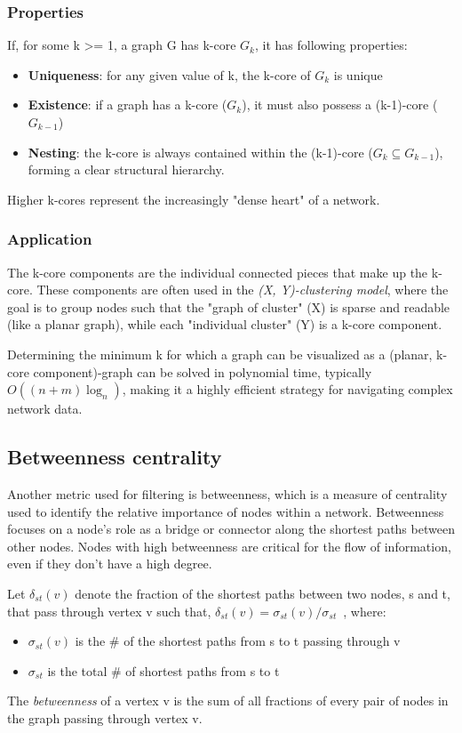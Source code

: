 \subsubsection{Properties}
If, for some k >= 1, a graph G has k-core \(G_k\), it has following properties:
\begin{itemize}[noitemsep]
    \item \textbf{Uniqueness}: for any given value of k, the k-core of \(G_k\) is unique
    \item \textbf{Existence}: if a graph has a k-core (\(G_k\)), it must also possess a (k-1)-core (\(G_{k-1}\))
    \item \textbf{Nesting}: the k-core is always contained within the (k-1)-core (\(G_k \subseteq G_{k-1}\)), forming a clear structural hierarchy.
\end{itemize}
Higher k-cores represent the increasingly "dense heart" of a network.

\subsubsection{Application}
The k-core components are the individual connected pieces that make up the k-core. These components are often used in the \textit{(X, Y)-clustering model}, where the goal is to group nodes such that the "graph of cluster" (X) is sparse and readable (like a planar graph), while each "individual cluster" (Y) is a k-core component. \par
Determining the minimum k for which a graph can be visualized as a (planar, k-core component)-graph can be solved in polynomial time, typically \(O((n+m)\log_n)\), making it a highly efficient strategy for navigating complex network data.

\subsection{Betweenness centrality}
Another metric used for filtering is betweenness, which is a measure of centrality used to identify the relative importance of nodes within a network. Betweenness focuses on a node's role as a bridge or connector along the shortest paths between other nodes. Nodes with high betweenness are critical for the flow of information, even if they don't have a high degree.
\begin{definition}[Betweenness]
    Let \(\delta_{st}(v)\) denote the fraction of the shortest paths between two nodes, s and t, that pass through vertex v such that,  \(\delta_{st}(v) = \sigma_{st}(v) / \sigma_{st}\)\ , where:
    \begin{itemize}[noitemsep]
        \item \(\sigma_{st}(v)\) is the \# of the shortest paths from s to t passing through v
        \item \(\sigma_{st}\) is the total \# of shortest paths from s to t
    \end{itemize}
    The \emph{betweenness} of a vertex v is the sum of all fractions of every pair of nodes in the graph passing through vertex v.
\end{definition}

